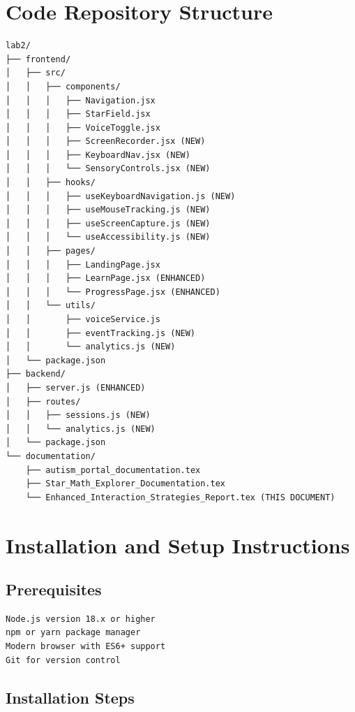 \documentclass[12pt, a4paper]{article}
\begin{document}
\newpage

\appendix

\section{Code Repository Structure}

\begin{verbatim}
lab2/
├── frontend/
│   ├── src/
│   │   ├── components/
│   │   │   ├── Navigation.jsx
│   │   │   ├── StarField.jsx
│   │   │   ├── VoiceToggle.jsx
│   │   │   ├── ScreenRecorder.jsx (NEW)
│   │   │   ├── KeyboardNav.jsx (NEW)
│   │   │   └── SensoryControls.jsx (NEW)
│   │   ├── hooks/
│   │   │   ├── useKeyboardNavigation.js (NEW)
│   │   │   ├── useMouseTracking.js (NEW)
│   │   │   ├── useScreenCapture.js (NEW)
│   │   │   └── useAccessibility.js (NEW)
│   │   ├── pages/
│   │   │   ├── LandingPage.jsx
│   │   │   ├── LearnPage.jsx (ENHANCED)
│   │   │   └── ProgressPage.jsx (ENHANCED)
│   │   └── utils/
│   │       ├── voiceService.js
│   │       ├── eventTracking.js (NEW)
│   │       └── analytics.js (NEW)
│   └── package.json
├── backend/
│   ├── server.js (ENHANCED)
│   ├── routes/
│   │   ├── sessions.js (NEW)
│   │   └── analytics.js (NEW)
│   └── package.json
└── documentation/
    ├── autism_portal_documentation.tex
    ├── Star_Math_Explorer_Documentation.tex
    └── Enhanced_Interaction_Strategies_Report.tex (THIS DOCUMENT)
\end{verbatim}

\section{Installation and Setup Instructions}

\subsection{Prerequisites}

\begin{verbatim}
Node.js version 18.x or higher
npm or yarn package manager
Modern browser with ES6+ support
Git for version control
\end{verbatim}

\subsection{Installation Steps}
\end{document}
